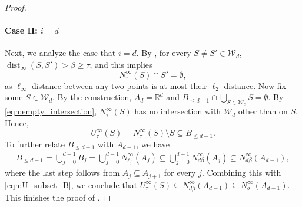 \documentclass[11pt,letterpaper]{article}
\theoremstyle{plain}
\theoremstyle{definition}
\theoremstyle{remark}
\DeclareMathOperator{\dist}{dist}
\begin{document}
\begin{proof}
\paragraph{Case II: $i = d$}
Next, we analyze the case that $i=d$.  
By , for every $S \neq S' \in \mathcal{W}_d$,
$\dist_\infty(S, S') > \beta \geq \tau$,
and this implies
\begin{equation}
    \label{eqn:empty_intersection}
    N_\tau^\infty(S) \cap S' = \emptyset,
\end{equation}
as $\ell_\infty$ distance between any two points is at most their $\ell_2$ distance.
Now fix some $S \in \mathcal{W}_d$.
By the construction, $A_d = \mathbb{R}^d$ and $B_{\leq d - 1} \cap \bigcup_{S \in \mathcal{W}_d} S = \emptyset$.
By \eqref{eqn:empty_intersection}, $N_\tau^\infty(S)$ has no intersection with  $\mathcal{W}_d$ other than on $S$.
Hence,
\begin{equation}
    \label{eqn:U_subset_B}
    U_\tau^\infty(S) = N_\tau^\infty(S) \setminus S \subseteq B_{\leq d - 1}.
\end{equation}
To further relate $B_{\leq d - 1}$ with $A_{d - 1}$, we have
\begin{align*}
    B_{\leq d - 1}
    = \bigcup_{j  = 0}^{d - 1} B_j
    = \bigcup_{j = 0}^{d  - 1}N_{\ell_j}^\infty(A_j)
    \subseteq \bigcup_{j = 0}^{d- 1} N_{d\beta}^\infty(A_j)
    \subseteq N_{d\beta}^\infty(A_{d - 1}),
\end{align*}
where the last step follows from $A_j \subseteq A_{j + 1}$ for every $j$.
Combining this with \eqref{eqn:U_subset_B}, we conclude that $U_\tau^\infty(S) \subseteq N_{d\beta}^\infty(A_{d - 1}) \subseteq N_{b}^\infty(A_{d - 1})$.
This finishes the proof of .
\end{proof}
\end{document}
